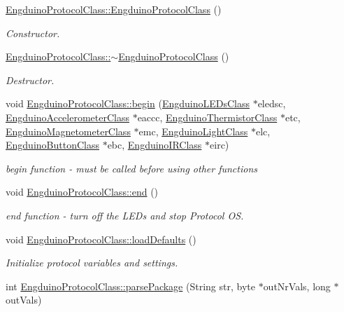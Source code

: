 \begin{DoxyCompactItemize}
\item 
\hyperlink{group___engduino_protocol_gaa4f020ed2ebb02ce57afce1c6395627c}{Engduino\+Protocol\+Class\+::\+Engduino\+Protocol\+Class} ()
\begin{DoxyCompactList}\small\item\em Constructor. \end{DoxyCompactList}\item 
\hyperlink{group___engduino_protocol_gad15fd39a7f4787cf6c8bbfc101df4387}{Engduino\+Protocol\+Class\+::$\sim$\+Engduino\+Protocol\+Class} ()
\begin{DoxyCompactList}\small\item\em Destructor. \end{DoxyCompactList}\item 
void \hyperlink{group___engduino_protocol_ga34fa624085b8267e2793094c67e083e2}{Engduino\+Protocol\+Class\+::begin} (\hyperlink{class_engduino_l_e_ds_class}{Engduino\+L\+E\+Ds\+Class} $\ast$eledsc, \hyperlink{class_engduino_accelerometer_class}{Engduino\+Accelerometer\+Class} $\ast$eaccc, \hyperlink{class_engduino_thermistor_class}{Engduino\+Thermistor\+Class} $\ast$etc, \hyperlink{class_engduino_magnetometer_class}{Engduino\+Magnetometer\+Class} $\ast$emc, \hyperlink{class_engduino_light_class}{Engduino\+Light\+Class} $\ast$elc, \hyperlink{class_engduino_button_class}{Engduino\+Button\+Class} $\ast$ebc, \hyperlink{class_engduino_i_r_class}{Engduino\+I\+R\+Class} $\ast$eirc)
\begin{DoxyCompactList}\small\item\em begin function -\/ must be called before using other functions \end{DoxyCompactList}\item 
void \hyperlink{group___engduino_protocol_ga9fe175a6fd0fce69ad087785485f4a61}{Engduino\+Protocol\+Class\+::end} ()
\begin{DoxyCompactList}\small\item\em end function -\/ turn off the L\+E\+Ds and stop Protocol O\+S. \end{DoxyCompactList}\item 
void \hyperlink{group___engduino_protocol_gaabeaf6ca75e6f6bbdc3cd9b42f4b8015}{Engduino\+Protocol\+Class\+::load\+Defaults} ()
\begin{DoxyCompactList}\small\item\em Initialize protocol variables and settings. \end{DoxyCompactList}\item 
int \hyperlink{group___engduino_protocol_ga13412494933a3beaaee8f41fb52b1128}{Engduino\+Protocol\+Class\+::parse\+Package} (String str, byte $\ast$out\+Nr\+Vals, long $\ast$out\+Vals)

\end{DoxyCompactItemize}
